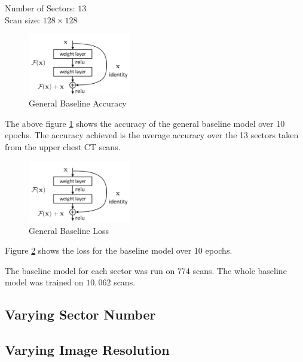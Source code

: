 \documentclass[10pt,twocolumn,letterpaper]{article}
\begin{document}
      \begin{center}
         Number of Sectors: $13$ \\
         Scan size: $128 \times 128$
      \end{center}
    
      \begin{figure}
         \centering
         \includegraphics[width=0.4\textwidth]{./images/residual.png}
         \caption{General Baseline Accuracy}
         \label{fig:experiments-general-acc}
      \end{figure}
    
      The above figure \ref{fig:experiments-general-acc} shows the accuracy of the general baseline model over 10 epochs.
      The accuracy achieved is the average accuracy over the 13 sectors taken from the upper chest CT scans.
    
      \begin{figure}
         \centering
         \includegraphics[width=0.4\textwidth]{./images/residual.png}
         \caption{General Baseline Loss}
         \label{fig:experiments-general-loss}
      \end{figure}
    
      Figure \ref{fig:experiments-general-loss} shows the loss for the baseline model over 10 epochs.
    
      The baseline model for each sector was run on $774$ scans. The whole baseline model was trained on $10,062$ scans.
   \subsection{Varying Sector Number} \label{sec:experiments-sector}


   \subsection{Varying Image Resolution} \label{sec:experiements-res}
\end{document}
